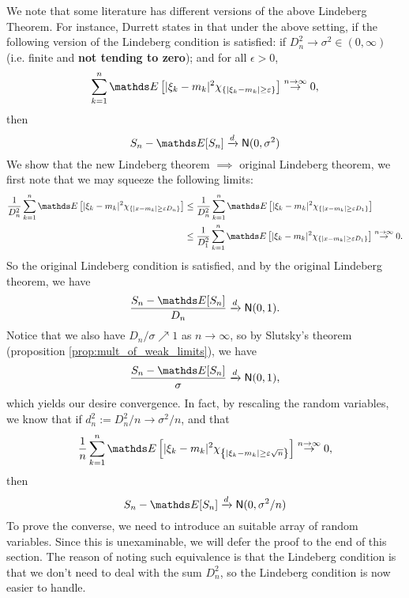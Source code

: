 \begin{remark} \label{rmk:other_CLT}
We note that some literature has different versions of the above Lindeberg Theorem. For instance, Durrett states in \cite{Durrett} that under the above setting, if the following version of the Lindeberg condition is satisfied: if $D_n^2 \to \sigma^2 \in (0,\infty)$ (i.e. finite and \textbf{not tending to zero}); and for all $\epsilon > 0$,
\begin{equation}
    \sum_{k=1}^n \E\sqbracket{|\xi_k - m_k|^2 \chi_{\set{|\xi_k-m_k|\ge \varepsilon}}} \overset{n\to\infty} \to 0,
\end{equation}
then
\begin{equation*}
S_n - \E[S_n] \xrightarrow{d} \mathsf{N}(0,\sigma^2)
\end{equation*}
We show that the new Lindeberg theorem $\implies$ original Lindeberg theorem, we first note that we may squeeze the following limits:
\begin{align*}
    \frac{1}{D_n^2} \sum_{k=1}^n \E\sqbracket{|\xi_k - m_k|^2 \chi_{\set{|x-m_k|\ge \varepsilon D_n}}} &\leq \frac{1}{D_n^2} \sum_{k=1}^n \E\sqbracket{|\xi_k - m_k|^2 \chi_{\set{|x-m_k|\ge \varepsilon D_1}}} \\
    &\leq \frac{1}{D_1^2} \sum_{k=1}^n \E\sqbracket{|\xi_k - m_k|^2 \chi_{\set{|x-m_k|\ge \varepsilon D_1}}} \overset{n\to\infty} \to 0.
\end{align*}
So the original Lindeberg condition is satisfied, and by the original Lindeberg theorem, we have
\begin{equation*}
    \frac{S_n - \E[S_n]}{D_n} \xrightarrow{d} \mathsf{N}(0,1).
\end{equation*}
Notice that we also have $D_n/\sigma \nearrow 1$ as $n \to \infty$, so by Slutsky's theorem (proposition \ref{prop:mult_of_weak_limits}), we have 
\begin{equation*}
    \frac{S_n - \E[S_n]}{\sigma} \xrightarrow{d} \mathsf{N}(0,1),
\end{equation*}
which yields our desire convergence. In fact, by rescaling the random variables, we know that if $d_n^2 := D_n^2 / n \to \sigma^2 / n$, and that 
\begin{equation}
    \frac{1}{n} \sum_{k=1}^n \E\sqbracket{|\xi_k - m_k|^2 \chi_{\set{|\xi_k-m_k|\ge \varepsilon \sqrt{n}}}} \overset{n\to\infty} \to 0,
\end{equation}
then 
\begin{equation*}
S_n - \E[S_n] \xrightarrow{d} \mathsf{N}(0,\sigma^2/n)
\end{equation*}
To prove the converse, we need to introduce an suitable array of random variables. Since this is unexaminable, we will defer the proof to the end of this section. The reason of noting such equivalence is that the Lindeberg condition is that we don't need to deal with the sum $D_n^2$, so the Lindeberg condition is now easier to handle.
\end{remark}

